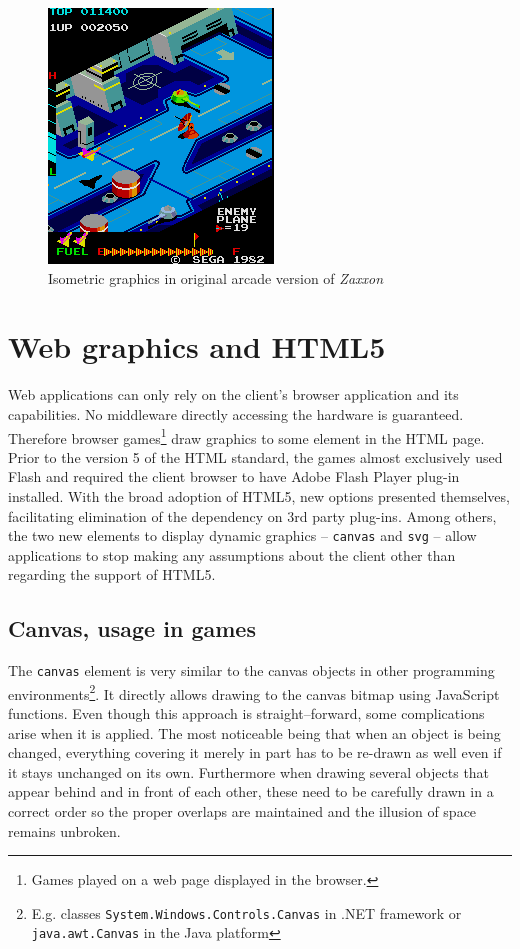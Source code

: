 \documentclass[11pt,oneside, final]{fithesis2}
\begin{document}
\begin{figure}[h]
	\centering
	\includegraphics{zaxxon}
	\caption{Isometric graphics in original arcade version of \emph{Zaxxon}\cite{zaxxon}}
	\label{zaxxon}
\end{figure}

\section{Web graphics and HTML5}
Web applications can only rely on the client's browser application and its capabilities. No middleware directly accessing the hardware is guaranteed. Therefore browser games\footnote{Games played on a web page displayed in the browser.} draw graphics to some element in the HTML page. Prior to the version 5 of the HTML standard, the games almost exclusively used Flash and required the client browser to have Adobe Flash Player plug-in installed\cite{flashplayer}. With the broad adoption of HTML5, new options presented themselves, facilitating elimination of the dependency on 3rd party plug-ins. Among others, the two new elements to display dynamic graphics -- \texttt{canvas} and \texttt{svg} -- allow applications to stop making any assumptions about the client other than regarding the support of HTML5\cite{w3_html5}.

\subsection{Canvas, usage in games}
The \texttt{canvas} element is very similar to the canvas objects in other programming environments\footnote{E.g. classes \texttt{System.Windows.Controls.Canvas} in .NET framework\cite{net_canvas} or \texttt{java.awt.Canvas} in the Java platform\cite{java_canvas}}. It directly allows drawing to the canvas bitmap using JavaScript functions. Even though this approach is straight--forward, some complications arise when it is applied. The most noticeable being that when an object is being changed, everything covering it merely in part has to be re-drawn as well even if it stays unchanged on its own. Furthermore when drawing several objects that appear behind and in front of each other, these need to be carefully drawn in a correct order so the proper overlaps are maintained and the illusion of space remains unbroken.
\end{document}
